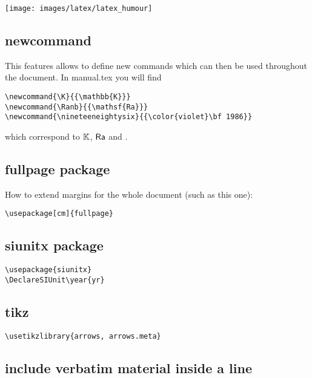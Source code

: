 
\begin{center}
\texttt{[image: images/latex/latex\_humour]}
\end{center}

\subsection*{newcommand}

This features allows to define new commands which can then be used throughout the document. 
In {\filenamefont manual.tex} you will find

\begin{verbatim}
\newcommand{\K}{{\mathbb{K}}}
\newcommand{\Ranb}{{\mathsf{Ra}}}
\newcommand{\nineteeneightysix}{{\color{violet}\bf 1986}}
\end{verbatim}

which correspond to $\K$, $\Ranb$ and \nineteeneightysix.


\subsection*{fullpage package}

How to extend margins for the whole document (such as this one):
\begin{verbatim}
\usepackage[cm]{fullpage}
\end{verbatim}


\subsection*{siunitx package}

\begin{verbatim}
\usepackage{siunitx} 
\DeclareSIUnit\year{yr}
\end{verbatim}


\subsection*{tikz}


\begin{verbatim}
\usetikzlibrary{arrows, arrows.meta}
\end{verbatim}


\subsection*{include verbatim material inside a line}

